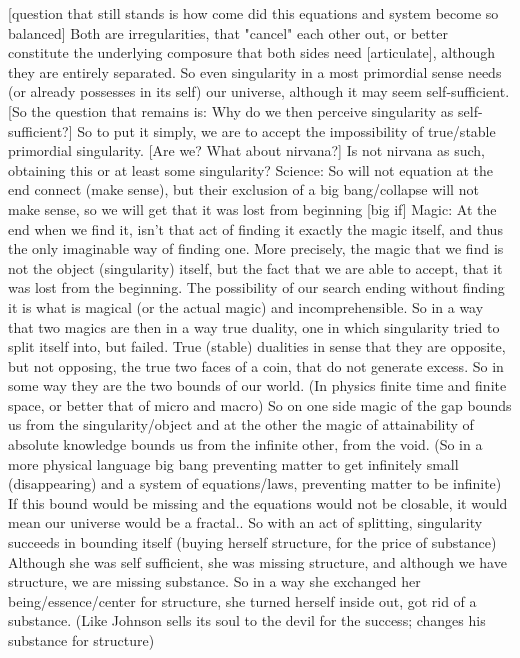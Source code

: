 \documentclass[10pt]{book}
\begin{document}
[question that still stands is how come did this equations and system become so balanced]
Both are irregularities, that "cancel" each other out, or better constitute the underlying composure that both sides need [articulate], although they are entirely separated.
So even singularity in a most primordial sense needs (or already possesses in its self) our universe, although it may seem self-sufficient. 
[So the question that remains is: Why do we then perceive singularity as self-sufficient?] So to put it simply, we are to accept the impossibility of true/stable primordial singularity. [Are we? What about nirvana?] Is not nirvana as such, obtaining this or at least some singularity?
Science:
So will not equation at the end connect (make sense), but their exclusion of a big bang/collapse will not make sense, so we will get that it was lost from beginning [big if]
Magic:
At the end when we find it, isn't that act of finding it exactly the magic itself, and thus the only imaginable way of finding one. More precisely, the magic that we find is not the object (singularity) itself, but the fact that we are able to accept, that it was lost from the beginning. The possibility of our search ending without finding it is what is magical (or the actual magic) and incomprehensible.
So in a way that two magics are then in a way true duality, one in which singularity tried to split itself into, but failed. True (stable) dualities in sense that they are opposite, but not opposing, the true two faces of a coin, that do not generate excess. So in some way they are the two bounds of our world. (In physics finite time and finite space, or better that of micro and macro) So on one side magic of the gap bounds us from the singularity/object and at the other the magic of attainability of absolute knowledge bounds us from the infinite other, from the void. (So in a more physical language big bang preventing matter to get infinitely small (disappearing) and a system of equations/laws, preventing matter to be infinite) If this bound would be missing and the equations would not be closable, it would mean our universe would be a fractal..
So with an act of splitting, singularity succeeds in bounding itself (buying herself structure, for the price of substance) Although she was self sufficient, she was missing structure, and although we have structure, we are missing substance. So in a way she exchanged her being/essence/center for structure, she turned herself inside out, got rid of a substance. (Like Johnson sells its soul to the devil for the success; changes his substance for structure)
\end{document}
